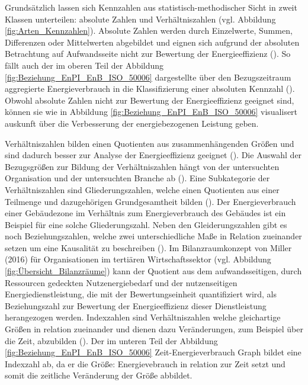 Grundsätzlich lassen sich Kennzahlen aus statistisch-methodischer Sicht in zweit Klassen unterteilen: absolute Zahlen und Verhältniszahlen (vgl. Abbildung \eqref{fig:Arten_Kennzahlen}).
Absolute Zahlen werden durch Einzelwerte, Summen, Differenzen oder Mittelwerten abgebildet und eignen sich aufgrund der absoluten Betrachtung auf Aufwandsseite nicht zur Bewertung der Energieeffizienz (\cite[S. 2]{Hohnhold.2013}).
So fällt auch der im oberen Teil der Abbildung \eqref{fig:Beziehung_EnPI_EnB_ISO_50006} dargestellte über den Bezugszeitraum aggregierte Energieverbrauch 
in die Klassifizierung einer absoluten Kennzahl (\cite[S. 2]{Hohnhold.2013}).
Obwohl absolute Zahlen nicht zur Bewertung der Energieeffizienz geeignet sind, können sie wie in Abbildung \eqref{fig:Beziehung_EnPI_EnB_ISO_50006} visualisert 
auskunft über die Verbesserung der energiebezogenen Leistung geben.

Verhältniszahlen bilden einen Quotienten aus zusammenhängenden Größen und sind dadurch besser zur Analyse der Energieeffizienz geeignet (\cite[S. 3]{Hohnhold.2013}).
Die Auswahl der Bezugsgrößen zur Bildung der Verhältniszahlen hängt von der untersuchten Organisation und der untersuchten Branche ab (\cite[S. 3]{Hohnhold.2013}). 
Eine Subkategorie der Verhältniszahlen sind Gliederungszahlen, welche einen Quotienten aus einer Teilmenge und dazugehörigen Grundgesamtheit bilden (\cite[S. 3]{Hohnhold.2013}).
Der Energieverbrauch einer Gebäudezone im Verhältnis zum Energieverbrauch des Gebäudes ist ein Beispiel für eine solche Gliederungszahl.
Neben den Gleiderungszahlen gibt es noch Beziehungszahlen, welche zwei unterschiedliche Maße in Relation zueinander setzen um eine Kausalität zu beschreiben (\cite[S. 3]{Hohnhold.2013}).
Im Bilanzraumkonzept von Miller (2016) für Organisationen im tertiären Wirtschaftssektor (vgl. Abbildung \eqref{fig:Übersicht_Bilanzräume}) kann der Quotient aus 
dem aufwandsseitigen, durch Ressourcen gedeckten Nutzenergiebedarf und der nutzenseitigen Energiedienstleistung, die mit der Bewertungseinheit quantifiziert wird, 
als Beziehungszahl zur Bewertung der Energieeffizienz dieser Dienstleistung herangezogen werden.
Indexzahlen sind Verhältniszahlen welche gleichartige Größen in relation zueinander und dienen dazu Veränderungen, zum Beispiel über die Zeit, abzubilden (\cite[S. 3f.]{Hohnhold.2013}).
Der im unteren Teil der Abbildung \eqref{fig:Beziehung_EnPI_EnB_ISO_50006} Zeit-Energieverbrauch Graph bildet eine Indexzahl ab, da er die Größe: Energievebrauch in relation zur 
Zeit setzt und somit die zeitliche Veränderung der Größe abbildet.

